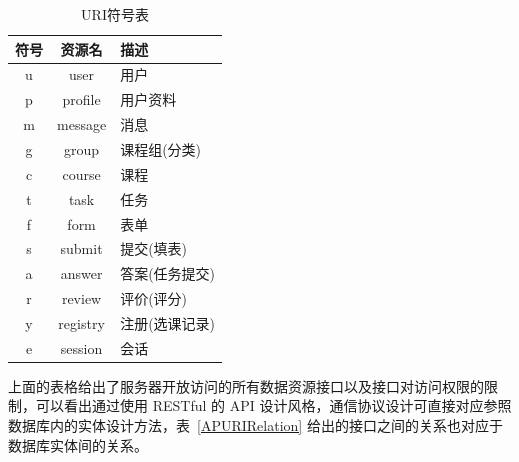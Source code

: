 \begin{table}[!h]
  \begin{center}
    \noindent
    \ttfamily
    \begin{tabular}{|c|c|l|}
      \hline
      \textbf{符号} & \textbf{资源名} & \textbf{描述} \\ \hline
      u & user      & 用户          \\ \hline
      p & profile   & 用户资料      \\ \hline
      m & message   & 消息          \\ \hline
      g & group     & 课程组(分类)  \\ \hline
      c & course    & 课程          \\ \hline
      t & task      & 任务          \\ \hline
      f & form      & 表单          \\ \hline
      s & submit    & 提交(填表)    \\ \hline
      a & answer    & 答案(任务提交)\\ \hline
      r & review    & 评价(评分)    \\ \hline
      y & registry  & 注册(选课记录)\\ \hline
      e & session   & 会话          \\ \hline
    \end{tabular}
    \caption{URI符号表\label{APURIGlossary}}
  \end{center}
\end{table}


上面的表格给出了服务器开放访问的所有数据资源接口以及接口对访问权限的限制，可以看出通过使用 RESTful 的 API 设计风格，通信协议设计可直接对应参照数据库内的实体设计方法，表~\ref{APURIRelation} 给出的接口之间的关系也对应于数据库实体间的关系。

